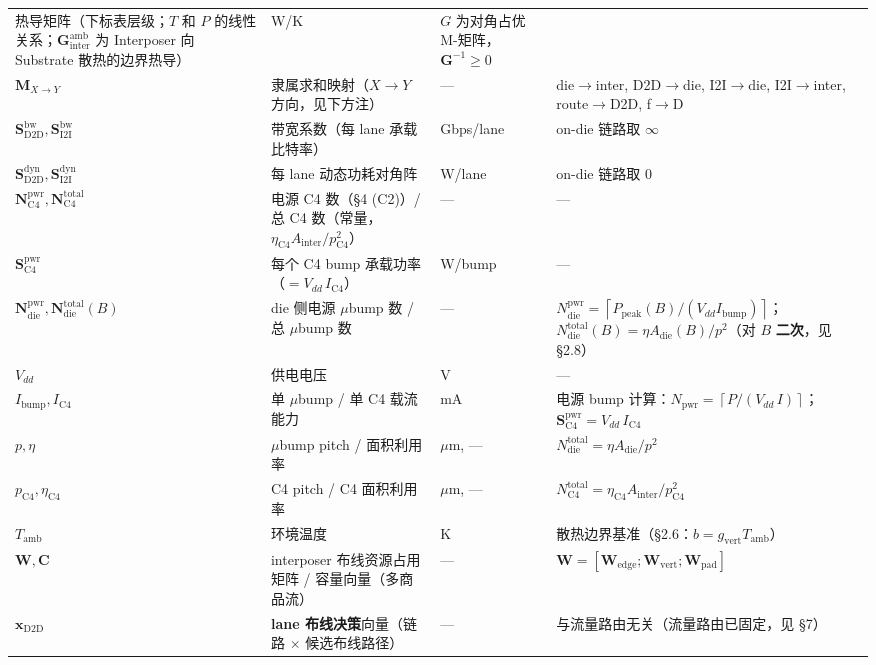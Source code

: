 \documentclass[11pt]{article}
\newcommand{\bv}{\mathbf}
\newcommand{\ceil}[1]{\left\lceil #1 \right\rceil}
\begin{document}
\begin{longtable}{@{}p{4.0cm}p{7.6cm}p{1.4cm}p{3.5cm}@{}}
热导矩阵（下标表层级；$T$ 和 $P$ 的线性关系；$\bv{G}_{\text{inter}}^{\text{amb}}$ 为 Interposer 向 Substrate 散热的边界热导） & W/K & $G$ 为对角占优 M-矩阵，$\bv{G}^{-1} \ge 0$ \\
$\bv{M}_{X \to Y}$ &
隶属求和映射（$X \to Y$ 方向，见下方注） & — & die$\to$inter, D2D$\to$die, I2I$\to$die, I2I$\to$inter, route$\to$D2D, f$\to$D \\
$\bv{S}_{\text{D2D}}^{\text{bw}}, \bv{S}_{\text{I2I}}^{\text{bw}}$ &
带宽系数（每 lane 承载比特率） & Gbps/lane & on-die 链路取 $\infty$ \\
$\bv{S}_{\text{D2D}}^{\text{dyn}}, \bv{S}_{\text{I2I}}^{\text{dyn}}$ &
每 lane 动态功耗对角阵 & W/lane & on-die 链路取 0 \\
$\bv{N}_{\text{C4}}^{\text{pwr}}, \bv{N}_{\text{C4}}^{\text{total}}$ &
电源 C4 数（§4 (C2)）/ 总 C4 数（常量，$\eta_{\text{C4}} A_{\text{inter}} / p_{\text{C4}}^2$） & — & — \\
$\bv{S}_{\text{C4}}^{\text{pwr}}$ &
每个 C4 bump 承载功率（$= V_{dd}\,I_{\text{C4}}$） & W/bump & — \\
$\bv{N}_{\text{die}}^{\text{pwr}}, \bv{N}_{\text{die}}^{\text{total}}(B)$ &
die 侧电源 $\mu$bump 数 / 总 $\mu$bump 数 & — & $N_{\text{die}}^{\text{pwr}} = \ceil{P_{\text{peak}}(B)/(V_{dd} I_{\text{bump}})}$；$N_{\text{die}}^{\text{total}}(B) = \eta A_{\text{die}}(B)/p^2$（对 $B$ \textbf{二次}，见 §2.8） \\
$V_{dd}$ &
供电电压 & V & — \\
$I_{\text{bump}}, I_{\text{C4}}$ &
单 $\mu$bump / 单 C4 载流能力 & mA & 电源 bump 计算：$N_{\text{pwr}} = \ceil{P/(V_{dd}\,I)}$；$\bv{S}_{\text{C4}}^{\text{pwr}} = V_{dd}\,I_{\text{C4}}$ \\
$p, \eta$ &
$\mu$bump pitch / 面积利用率 & $\mu$m, — & $N_{\text{die}}^{\text{total}} = \eta A_{\text{die}}/p^2$ \\
$p_{\text{C4}}, \eta_{\text{C4}}$ &
C4 pitch / C4 面积利用率 & $\mu$m, — & $N_{\text{C4}}^{\text{total}} = \eta_{\text{C4}} A_{\text{inter}}/p_{\text{C4}}^2$ \\
$T_{\text{amb}}$ &
环境温度 & K & 散热边界基准（§2.6：$b = g_{\text{vert}} T_{\text{amb}}$） \\
$\bv{W}, \bv{C}$ &
interposer 布线资源占用矩阵 / 容量向量（多商品流） & — & $\bv{W} = [\bv{W}_{\text{edge}}; \bv{W}_{\text{vert}}; \bv{W}_{\text{pad}}]$ \\
$\bv{x}_{\text{D2D}}$ &
\textbf{lane 布线决策}向量（链路 $\times$ 候选布线路径） & — & 与流量路由无关（流量路由已固定，见 §7） \\

\end{longtable}
\end{document}
